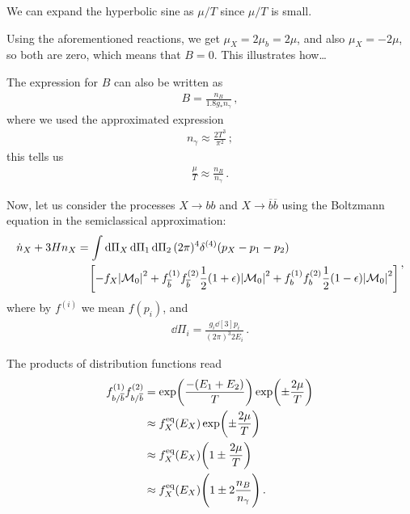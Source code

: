 \documentclass[main.tex]{subfiles}
\begin{document}
We can expand the hyperbolic sine as \(\mu / T\) since \(\mu / T\) is small. 

Using the aforementioned reactions, we get \(\mu _X = 2 \mu _b = 2 \mu \), and also \(\mu _X = - 2 \mu \), so both are zero, which means that \(B = 0\). 
This illustrates how\dots

The expression for \(B\) can also be written as 
%
\begin{align}
B = \frac{n_B}{\num{1.8} g_* n_\gamma } 
\,,
\end{align}
%
where we used the approximated expression 
%
\begin{align}
n_\gamma \approx \frac{2 T^3}{\pi^2}
\,;
\end{align}
%
this tells us 
%
\begin{align}
\frac{\mu}{T} \approx \frac{n_B}{n_\gamma }
\,.
\end{align}

Now, let us consider the processes \(X \to bb\) and \(X \to \overline{b} \overline{b}\) using the Boltzmann equation in the semiclassical approximation: 
%
\begin{align}
\begin{split}
\dot{n}_X + 3 H n_X &= 
\int \dd{\Pi_X } \dd{\Pi_1 } \dd{\Pi _2} (2 \pi )^{4} \delta^{(4)}(p_X - p_1 - p_2)\\
&\phantom{=}\ 
\qty[-f_X \abs{\mathcal{M}_0}^2 
+ f_{\overline{b}}^{(1)} f_{\overline{b}}^{(2)} \frac{1}{2} (1 + \epsilon ) \abs{\mathcal{M}_0}^2
+ f_{b}^{(1)} f_{b}^{(2)} \frac{1}{2} (1 - \epsilon ) \abs{\mathcal{M}_0}^2
]
\end{split}
\,,
\end{align}
%
where by \(f^{(i)}\) we mean \(f(p_i)\), and
%
\begin{align}
\dd{\Pi _i} = \frac{g_i \dd[3]{p_i}}{(2 \pi )^3 2 E_i}
\,.
\end{align}

The products 
of distribution functions read 
%
\begin{align}
f_{b/ \overline{b}}^{(1)} f_{b/ \overline{b}}^{(2)}  &= \exp(\frac{-(E_1 + E_2 )}{T}) \exp(\pm \frac{2 \mu }{T})  \\
&\approx f_X^{\text{eq}} (E_X) \exp(\pm \frac{2 \mu }{T})  \\
&\approx f_X^{\text{eq}} (E_X) \qty(1 \pm \frac{2\mu}{T})  \\
&\approx f_X^{\text{eq}} (E_X) \qty(1 \pm 2 \frac{n_B}{n_\gamma })
\,.
\end{align}
\end{document}
